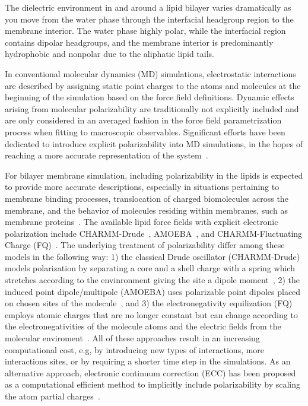 \documentclass[journal=jacsat,manuscript=article,layout=singlecolumn]{achemso}
\begin{document}
The dielectric environment in and around a lipid bilayer varies dramatically as you move from the water phase through the interfacial headgroup region to the membrane interior. The water phase highly polar, while the interfacial region contains dipolar headgroups, and the membrane interior is predominantly hydrophobic and nonpolar due to the aliphatic lipid tails. 

In conventional molecular dynamics (MD) simulations, electrostatic interactions are described by assigning static point charges to the atoms and molecules at the beginning of the simulation based on the force field definitions. Dynamic effects arising from molecular polarizability are traditionally not explicitly included and are only considered in an averaged fashion in the force field parametrization process when fitting to macroscopic observables. Significant efforts have been dedicated to introduce explicit polarizability into MD simulations, in the hopes of reaching a more accurate representation of the system~\cite{Thole1981,ando2001stable,Grossfield2003,
lamoreux2003,Antila2013 ,Lemkul2016, baker2015polarizable,jing2019polarizable }. 

For bilayer membrane simulation, including polarizability in the lipids is expected to provide more accurate descriptions, especially in situations pertaining to membrane binding processes, translocation of charged biomolecules across the membrane, and the behavior of molecules residing within membranes, such as membrane proteins~\cite{baker2015polarizable,Lemkul2016, li2017drude,chu2018anionicpolarizable,Lynch21,Chen2021,Melcr:2018a, melcr2019improved,nencini22}. 
The available lipid force fields with explicit electronic polarization include CHARMM-Drude~\cite{li2017drude, yu2023drude}, AMOEBA~\cite{chu2018anionicpolarizable,chu2018polarizable}, and CHARMM-Fluctuating Charge (FQ)~\cite{lucas2012charge}. The underlying treatment of polarizability differ among these models in the following way:  1) the classical Drude oscillator (CHARMM-Drude) models polarization by separating a core and a shell charge with a spring which stretches according to the envinronment giving the site a dipole moment~\cite{Lemkul2016},
2) the induced point dipole/multipole (AMOEBA) uses polarizable point dipoles placed on chosen sites of the molecule~\cite{ponder2010current},
and 3) the electronegativity equilization (FQ) employs atomic charges that are no longer constant but can change according to the electronegativities of the molecule atoms and the electric fields from the molecular enviroment~\cite{patel2004charmm}. All of these approaches result in an increasing computational cost, e.g, by introducing new types of interactions, more interactions sites, or by requiring a shorter time step in the simulations. As an alternative approach, electronic continuum correction (ECC) has been proposed as a computational efficient method to implicitly include polarizability by scaling the atom partial charges~\cite{Melcr:2018a,dijon20,Antila2021}.
\end{document}
